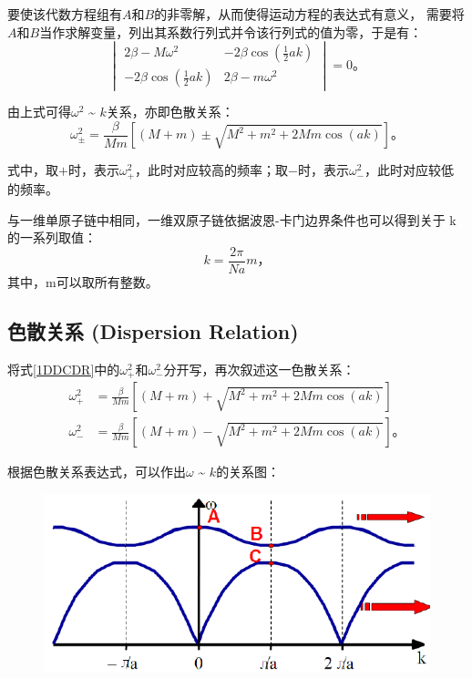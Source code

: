\documentclass[declarePage]{ecnuthesis}
\begin{document}
要使该代数方程组有$A$和$B$的非零解，从而使得运动方程的表达式有意义，%
需要将$A$和$B$当作求解变量，列出其系数行列式并令该行列式的值为零，于是有：
\begin{equation}
    \begin{vmatrix}
        2 \beta - M \omega ^2 & -2 \beta \cos (\frac{1}{2}ak)\\
        -2\beta\cos (\frac{1}{2}ak) & 2\beta - m \omega ^2
    \end{vmatrix}
    =0 \text{。}
\end{equation}

由上式可得$\omega^2$ \~{} $k$关系，亦即色散关系：
\begin{equation}
    \omega^2_\pm=\frac{\beta}{Mm}[(M+m)\pm\sqrt{M^2+m^2+2Mm\cos(ak)}] \text{。} \label{1DDCDR}
\end{equation}

式中，取$+$时，表示$\omega_+^2$，此时对应较高的频率；取$-$时，表示$\omega_-^2$，此时对应较低的频率。

与一维单原子链中相同，一维双原子链依据波恩-卡门边界条件也可以得到关于 k 的一系列取值：
\begin{equation}
    k = \frac{2\pi}{Na}m \text{，} \label{1DDCK}
\end{equation}
其中，m可以取所有整数。

\subsection{色散关系 (Dispersion Relation)}

将式\ref{1DDCDR}中的$\omega_+^2$和$\omega_-^2$分开写，再次叙述这一色散关系：
\begin{align}
    \omega^2_+&=\frac{\beta}{Mm}[(M+m)+\sqrt{M^2+m^2+2Mm\cos(ak)}]\\
    \omega^2_-&=\frac{\beta}{Mm}[(M+m)-\sqrt{M^2+m^2+2Mm\cos(ak)}] \text{。}
\end{align}

根据色散关系表达式，可以作出$\omega$ \~{} $k$的关系图：
\begin{figure}[htb]
    \centering
    \includegraphics[width=.4\textwidth]{1DDCDR.png}
\end{figure}
\end{document}
